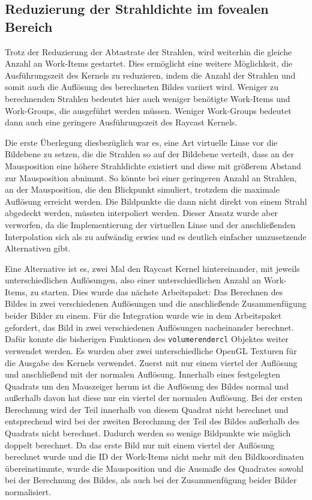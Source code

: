 \subsection*{Reduzierung der Strahldichte im fovealen Bereich}
Trotz der Reduzierung der Abtastrate der Strahlen, wird weiterhin die gleiche Anzahl an Work-Items gestartet.
Dies ermöglicht eine weitere Möglichkeit, die Ausführungszeit des Kernels zu reduzieren, indem die Anzahl der Strahlen und somit auch die Auflösung des berechneten Bildes variiert wird.
Weniger zu berechnenden Strahlen bedeutet hier auch weniger benötigte Work-Items und Work-Groups, die ausgeführt werden müssen.
Weniger Work-Groups bedeutet dann auch eine geringere Ausführungszeit des Raycast Kernels.

Die erste Überlegung diesbezüglich war es, eine Art virtuelle Linse vor die Bildebene zu setzen, die die Strahlen so auf der Bildebene verteilt, dass an der Mausposition eine höhere Strahldichte existiert und diese mit größerem Abstand zur Mausposition abnimmt.
So könnte bei einer geringeren Anzahl an Strahlen, an der Mausposition, die den Blickpunkt simuliert, trotzdem die maximale Auflösung erreicht werden.
Die Bildpunkte die dann nicht direkt von einem Strahl abgedeckt werden, müssten interpoliert werden.
Dieser Ansatz wurde aber verworfen, da die Implementierung der virtuellen Linse und der anschließenden Interpolation sich als zu aufwändig erwies und es deutlich einfacher umzusetzende Alternativen gibt.

Eine Alternative ist es, zwei Mal den Raycast Kernel hintereinander, mit jeweils unterschiedlichen Auflösungen, also einer unterschiedlichen Anzahl an Work-Items, zu starten.
Dies wurde das nächste Arbeitspaket: Das Berechnen des Bildes in zwei verschiedenen Auflösungen und die anschließende Zusammenfügung beider Bilder zu einem.
Für die Integration wurde wie in dem Arbeitspaket gefordert, das Bild in zwei verschiedenen Auflösungen nacheinander berechnet.
Dafür konnte die bisherigen Funktionen des \texttt{volumerendercl} Objektes weiter verwendet werden.
Es wurden aber zwei unterschiedliche OpenGL Texturen für die Ausgabe des Kernels verwendet.
Zuerst mit nur einem viertel der Auflösung und anschließend mit der normalen Auflösung.
Innerhalb eines festgelegten Quadrats um den Mauszeiger herum ist die Auflösung des Bildes normal und außerhalb davon hat diese nur ein viertel der normalen Auflösung.
Bei der ersten Berechnung wird der Teil innerhalb von diesem Quadrat nicht berechnet und entsprechend wird bei der zweiten Berechnung der Teil des Bildes außerhalb des Quadrats nicht berechnet.
Dadurch werden so wenige Bildpunkte wie möglich doppelt berechnet.
Da das erste Bild nur mit einem viertel der Auflösung berechnet wurde und die ID der Work-Items nicht mehr mit den Bildkoordinaten übereinstimmte, wurde die Mausposition und die Ausmaße des Quadrates sowohl bei der Berechnung des Bildes, als auch bei der Zusammenfügung beider Bilder normalisiert.

